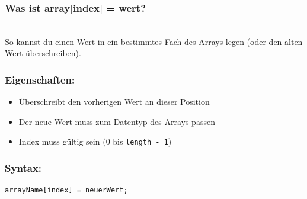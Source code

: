 \subsubsection*{Was ist array[index] = wert?}\\
So kannst du einen Wert in ein bestimmtes Fach des Arrays legen (oder den alten Wert überschreiben).

\subsubsection*{Eigenschaften:}
\begin{itemize}
	\item Überschreibt den vorherigen Wert an dieser Position
	\item Der neue Wert muss zum Datentyp des Arrays passen
	\item Index muss gültig sein (0 bis \texttt{length - 1})
\end{itemize}

\subsubsection*{Syntax:}
\begin{lstlisting}
arrayName[index] = neuerWert;
\end{lstlisting}

